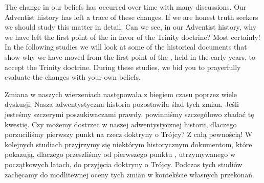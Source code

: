 The change in our beliefs has occurred over time with many discussions. Our Adventist history has left a trace of these changes. If we are honest truth seekers we should study this matter in detail. Can we see, in our Adventist history, why we have left the first point of the  in favor of the Trinity doctrine? Most certainly! In the following studies we will look at some of the historical documents that show why we have moved from the first point of the , held in the early years, to accept the Trinity doctrine. During these studies, we bid you to prayerfully evaluate the changes with your own beliefs.


Zmiana w naszych wierzeniach następowała z biegiem czasu poprzez wiele dyskusji. Nasza adwentystyczna historia pozostawiła ślad tych zmian. Jeśli jesteśmy szczerymi poszukiwaczami prawdy, powinniśmy szczegółowo zbadać tę kwestię. Czy możemy dostrzec w naszej adwentystycznej historii, dlaczego porzuciliśmy pierwszy punkt  na rzecz doktryny o Trójcy? Z całą pewnością! W kolejnych studiach przyjrzymy się niektórym historycznym dokumentom, które pokazują, dlaczego przeszliśmy od pierwszego punktu , utrzymywanego w początkowych latach, do przyjęcia doktryny o Trójcy. Podczas tych studiów zachęcamy do modlitewnej oceny tych zmian w kontekście własnych przekonań.
